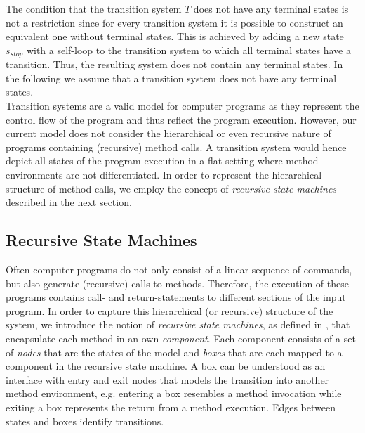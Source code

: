 \documentclass[a4paper, 12pt, twoside]{report}
\begin{document}
	The condition that the transition system $T$ does not have any terminal states is not a restriction since for every transition system it is possible to construct an equivalent one without terminal states. This is achieved by adding a new state $s_{stop}$ with a self-loop to the transition system to which all terminal states have a transition. Thus, the resulting system does not contain any terminal states. In the following we assume that a transition system does not have any terminal states.\\
	
	Transition systems are a valid model for computer programs as they represent the control flow of the program and thus reflect the program execution. However, our current model does not consider the hierarchical or even recursive nature of programs containing (recursive) method calls. A transition system would hence depict all states of the program execution in a flat setting where method environments are not differentiated. In order to represent the hierarchical structure of method calls, we employ the concept of \textit{recursive state machines} described in the next section.	

	\subsection{Recursive State Machines}
	
	Often computer programs do not only consist of a linear sequence of commands, but also generate (recursive) calls to methods. Therefore, the execution of these programs contains call- and return-statements to different sections of the input program. In order to capture this hierarchical (or recursive) structure of the system, we introduce the notion of \textit{recursive state machines}, as defined in \cite{alur2001analysis}, that encapsulate each method in an own \textit{component}. Each component consists of a set of \textit{nodes} that are the states of the model and \textit{boxes} that are each mapped to a component in the recursive state machine. A box can be understood as an interface with entry and exit nodes that models the transition into another method environment, e.g. entering a box resembles a method invocation while exiting a box represents the return from a method execution. Edges between states and boxes identify transitions. 
	
\end{document}
